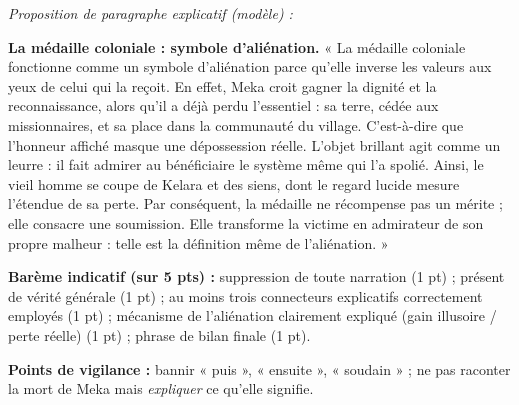 \documentclass[11pt]{article}
\begin{document}
\begin{corrige}
\emph{Proposition de paragraphe explicatif (modèle) :}

\textbf{La médaille coloniale : symbole d'aliénation.} « La médaille coloniale fonctionne comme un symbole d'aliénation parce qu'elle inverse les valeurs aux yeux de celui qui la reçoit. En effet, Meka croit gagner la dignité et la reconnaissance, alors qu'il a déjà perdu l'essentiel : sa terre, cédée aux missionnaires, et sa place dans la communauté du village. C'est-à-dire que l'honneur affiché masque une dépossession réelle. L'objet brillant agit comme un leurre : il fait admirer au bénéficiaire le système même qui l'a spolié. Ainsi, le vieil homme se coupe de Kelara et des siens, dont le regard lucide mesure l'étendue de sa perte. Par conséquent, la médaille ne récompense pas un mérite ; elle consacre une soumission. Elle transforme la victime en admirateur de son propre malheur : telle est la définition même de l'aliénation. »

\textbf{Barème indicatif (sur 5 pts) :} suppression de toute narration (1 pt) ; présent de vérité générale (1 pt) ; au moins trois connecteurs explicatifs correctement employés (1 pt) ; mécanisme de l'aliénation clairement expliqué (gain illusoire / perte réelle) (1 pt) ; phrase de bilan finale (1 pt).

\textbf{Points de vigilance :} bannir « puis », « ensuite », « soudain » ; ne pas raconter la mort de Meka mais \emph{expliquer} ce qu'elle signifie.
\end{corrige}
\end{document}
